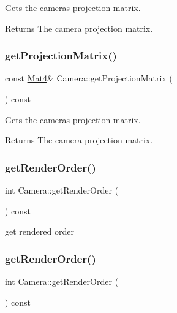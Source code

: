 Gets the camera\textquotesingle{}s projection matrix.

\begin{DoxyReturn}{Returns}
The camera projection matrix. 
\end{DoxyReturn}
\mbox{\label{classCamera_a5fd60cb16045d8102c88db4a8c2f20f0}} 
\subsubsection{\texorpdfstring{get\+Projection\+Matrix()}{getProjectionMatrix()}\hspace{0.1cm}{\footnotesize\ttfamily [2/2]}}
{\footnotesize\ttfamily const \hyperlink{classMat4}{Mat4}\& Camera\+::get\+Projection\+Matrix (\begin{DoxyParamCaption}{ }\end{DoxyParamCaption}) const}

Gets the camera\textquotesingle{}s projection matrix.

\begin{DoxyReturn}{Returns}
The camera projection matrix. 
\end{DoxyReturn}
\mbox{\label{classCamera_a126d10fabc05a9debd3c134f75dc0c14}} 
\subsubsection{\texorpdfstring{get\+Render\+Order()}{getRenderOrder()}\hspace{0.1cm}{\footnotesize\ttfamily [1/2]}}
{\footnotesize\ttfamily int Camera\+::get\+Render\+Order (\begin{DoxyParamCaption}{ }\end{DoxyParamCaption}) const}

get rendered order \mbox{\label{classCamera_a126d10fabc05a9debd3c134f75dc0c14}} 
\subsubsection{\texorpdfstring{get\+Render\+Order()}{getRenderOrder()}\hspace{0.1cm}{\footnotesize\ttfamily [2/2]}}
{\footnotesize\ttfamily int Camera\+::get\+Render\+Order (\begin{DoxyParamCaption}{ }\end{DoxyParamCaption}) const}

